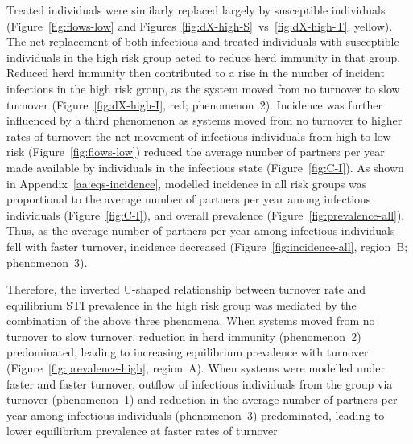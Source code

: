 Treated individuals were similarly replaced largely by susceptible individuals
(Figure~\ref{fig:flows-low} and
Figures~\ref{fig:dX-high-S}~vs~\ref{fig:dX-high-T}, yellow).
The net replacement of both infectious and treated individuals with susceptible individuals
in the high risk group acted to reduce herd immunity in that group.
Reduced herd immunity then contributed to a rise in
the number of incident infections in the high risk group,
as the system moved from no turnover to slow turnover
(Figure~\ref{fig:dX-high-I}, red; phenomenon~2).
Incidence was further influenced by a third phenomenon
as systems moved from no turnover to higher rates of turnover:
the net movement of infectious individuals
from high to low risk (Figure~\ref{fig:flows-low})
reduced the average number of partners per year made available by
individuals in the infectious state (Figure~\ref{fig:C-I}).
As shown in Appendix~\ref{aa:eqs-incidence},
modelled incidence in all risk groups was proportional to
the average number of partners per year among infectious individuals
(Figure~\ref{fig:C-I}),
and overall prevalence
(Figure~\ref{fig:prevalence-all}).
Thus, as the average number of partners per year among infectious individuals
fell with faster turnover, incidence decreased
(Figure~\ref{fig:incidence-all}, region~B; phenomenon~3).
\par
Therefore, the inverted U-shaped relationship between turnover rate
and equilibrium STI prevalence in the high risk group was mediated
by the combination of the above three phenomena.
When systems moved from no turnover to slow turnover,
reduction in herd immunity (phenomenon~2) predominated,
leading to increasing equilibrium prevalence with turnover
(Figure~\ref{fig:prevalence-high}, region~A).
When systems were modelled under faster and faster turnover,
outflow of infectious individuals from the group via turnover (phenomenon~1) and
reduction in the average number of partners per year among infectious individuals (phenomenon~3)
predominated, leading to lower equilibrium prevalence at faster rates of turnover
